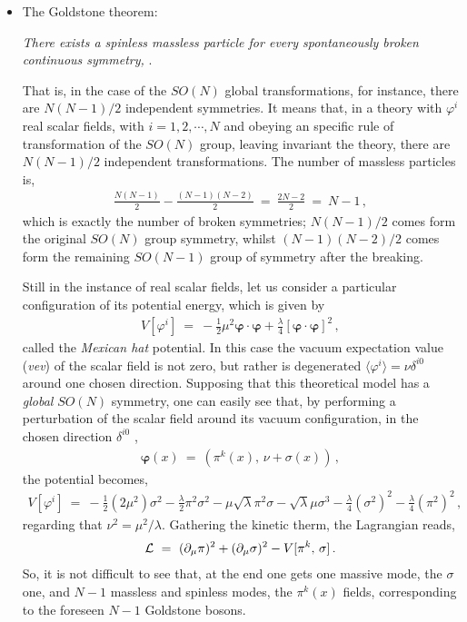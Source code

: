\begin{itemize}
\item The Goldstone theorem:

\emph{There exists a spinless massless particle for every spontaneously broken continuous
symmetry,} \cite{Weinberg:1996kr,Peskin:1995ev,Ryder:1985wq,Greensite:2011zz}.

That is, in the case of the $SO(N)$ global transformations, for instance, there are $N(N-1)/2$
independent symmetries. It means that, in a theory with $\varphi^{i}$ real scalar fields, with
$i=1,2,\cdots,N$ and obeying an specific rule of transformation of the $SO(N)$ group, leaving invariant the theory, there are $N(N-1)/2$ independent transformations. The number of massless particles is,
\begin{eqnarray}
\frac{N(N-1)}{2} - \frac{(N-1)(N-2)}{2} ~=~ \frac{2N -2}{2} ~=~ N-1\,,
\end{eqnarray}
which is exactly the number of broken symmetries; $N(N - 1)/2$ comes form the original $SO(N)$
group symmetry, whilst $(N -1)(N-2)/2$ comes form the remaining $SO(N-1)$ group of symmetry
after the breaking.

Still in the instance of real scalar fields, let us consider a particular configuration of its
potential energy, which is given by
\begin{eqnarray}
V[\varphi^{i}] ~=~ - \frac12 \mu^{2} \pmb{\varphi}\cdot\pmb{\varphi} +
\frac{\lambda}{4}\left[ \pmb{\varphi}\cdot\pmb{\varphi} \right]^{2}\,,
\label{mexianhat}
\end{eqnarray}
called the \emph{Mexican hat} potential. In this case the vacuum expectation value (\emph{vev})
of the scalar field is not zero, but rather is degenerated $\langle  \varphi^{i} \rangle
=\nu\delta^{i0}$ around one chosen direction.
Supposing that this theoretical model has a \emph{global} $SO(N)$ symmetry, one can easily see
that, by performing a perturbation of the scalar field around its vacuum configuration, in the
chosen direction $\delta^{i0}$
\cite{Weinberg:1996kr,Peskin:1995ev,Ryder:1985wq,Greensite:2011zz},
\begin{eqnarray}
\pmb{\varphi}(x) ~=~ (\pi^{k}(x),\, \nu + \sigma(x))\,,
\end{eqnarray}
the potential becomes,
\begin{eqnarray}
V[\varphi^{i}] ~=~ - \frac12 (2\mu^{2}) {\sigma}^{2} - \frac{\lambda}{2}\pi^{2}\sigma^{2} -
\mu\sqrt{\lambda}\pi^{2}\sigma - \sqrt{\lambda}\mu \sigma^{3} - \frac{\lambda}{4}(\sigma^{2})^{2}
- \frac{\lambda}{4}(\pi^{2})^{2}
\,,
\end{eqnarray}
regarding that $\nu^{2} = \mu^2/\lambda$. Gathering the kinetic therm, the Lagrangian reads,
\begin{eqnarray}
{\cal L} ~=~  (\partial_{\mu}\pi)^{2} + (\partial_{\mu}\sigma)^{2} - V[\pi^{k},\,\sigma]\,.
\end{eqnarray}
So, it is not difficult to see that, at the end one gets one massive mode, the $\sigma$ one,
and $N-1$ massless and spinless modes, the $\pi^{k}(x)$ fields, corresponding to the foreseen
$N-1$ Goldstone bosons.



\end{itemize}
